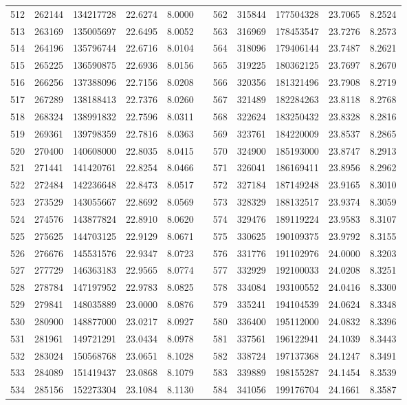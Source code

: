 \begin{longtable}{rrrrrrrrrrr}
512&262144&134217728&22.6274&8.0000&&562&315844&177504328&23.7065&8.2524\\
513&263169&135005697&22.6495&8.0052&&563&316969&178453547&23.7276&8.2573\\
514&264196&135796744&22.6716&8.0104&&564&318096&179406144&23.7487&8.2621\\
515&265225&136590875&22.6936&8.0156&&565&319225&180362125&23.7697&8.2670\\
516&266256&137388096&22.7156&8.0208&&566&320356&181321496&23.7908&8.2719\\
517&267289&138188413&22.7376&8.0260&&567&321489&182284263&23.8118&8.2768\\
518&268324&138991832&22.7596&8.0311&&568&322624&183250432&23.8328&8.2816\\
519&269361&139798359&22.7816&8.0363&&569&323761&184220009&23.8537&8.2865\\
520&270400&140608000&22.8035&8.0415&&570&324900&185193000&23.8747&8.2913\\
521&271441&141420761&22.8254&8.0466&&571&326041&186169411&23.8956&8.2962\\
522&272484&142236648&22.8473&8.0517&&572&327184&187149248&23.9165&8.3010\\
523&273529&143055667&22.8692&8.0569&&573&328329&188132517&23.9374&8.3059\\
524&274576&143877824&22.8910&8.0620&&574&329476&189119224&23.9583&8.3107\\
525&275625&144703125&22.9129&8.0671&&575&330625&190109375&23.9792&8.3155\\
526&276676&145531576&22.9347&8.0723&&576&331776&191102976&24.0000&8.3203\\
527&277729&146363183&22.9565&8.0774&&577&332929&192100033&24.0208&8.3251\\
528&278784&147197952&22.9783&8.0825&&578&334084&193100552&24.0416&8.3300\\
529&279841&148035889&23.0000&8.0876&&579&335241&194104539&24.0624&8.3348\\
530&280900&148877000&23.0217&8.0927&&580&336400&195112000&24.0832&8.3396\\
531&281961&149721291&23.0434&8.0978&&581&337561&196122941&24.1039&8.3443\\
532&283024&150568768&23.0651&8.1028&&582&338724&197137368&24.1247&8.3491\\
533&284089&151419437&23.0868&8.1079&&583&339889&198155287&24.1454&8.3539\\
534&285156&152273304&23.1084&8.1130&&584&341056&199176704&24.1661&8.3587\\

\end{longtable}
